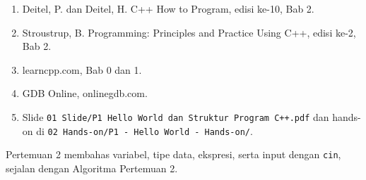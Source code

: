 \documentclass[a4paper]{article}
\begin{document}
\begin{enumerate}
\item Deitel, P. dan Deitel, H. C++ How to Program, edisi ke-10, Bab 2.
\item Stroustrup, B. Programming: Principles and Practice Using C++, edisi ke-2, Bab 2.
\item learncpp.com, Bab 0 dan 1.
\item GDB Online, onlinegdb.com.
\item Slide \texttt{01 Slide/P1 Hello World dan Struktur Program C++.pdf} dan hands-on di \texttt{02 Hands-on/P1 - Hello World - Hands-on/}.
\end{enumerate}
\begin{Penting}
Pertemuan 2 membahas variabel, tipe data, ekspresi, serta input dengan \texttt{cin}, sejalan dengan Algoritma Pertemuan 2.
\end{Penting}
\end{document}
